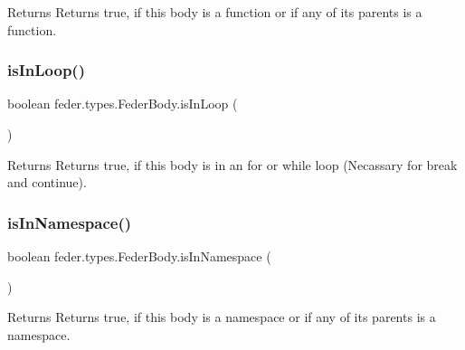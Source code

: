 \begin{DoxyReturn}{Returns}
Returns true, if this body is a function or if any of its parents is a function. 
\end{DoxyReturn}
\mbox{\label{classfeder_1_1types_1_1FederBody_adf3772434a48f9ac4d203a5e8b7c11fc}} 
\subsubsection{\texorpdfstring{is\+In\+Loop()}{isInLoop()}}
{\footnotesize\ttfamily boolean feder.\+types.\+Feder\+Body.\+is\+In\+Loop (\begin{DoxyParamCaption}{ }\end{DoxyParamCaption})}

\begin{DoxyReturn}{Returns}
Returns true, if this body is in an \textquotesingle{}for\textquotesingle{} or \textquotesingle{}while\textquotesingle{} loop (Necassary for \textquotesingle{}break\textquotesingle{} and \textquotesingle{}continue\textquotesingle{}). 
\end{DoxyReturn}
\mbox{\label{classfeder_1_1types_1_1FederBody_a0947a2d7c8ada0a1960fc1536c25731b}} 
\subsubsection{\texorpdfstring{is\+In\+Namespace()}{isInNamespace()}}
{\footnotesize\ttfamily boolean feder.\+types.\+Feder\+Body.\+is\+In\+Namespace (\begin{DoxyParamCaption}{ }\end{DoxyParamCaption})}

\begin{DoxyReturn}{Returns}
Returns true, if this body is a namespace or if any of its parents is a namespace. 
\end{DoxyReturn}
\mbox{\label{classfeder_1_1types_1_1FederBody_a38b513fed4f62a653f7dd5a8a8dcca96}} 
